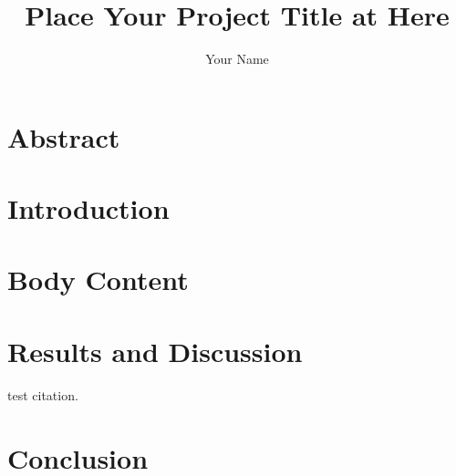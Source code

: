 \documentclass[12pt,a4paper,]{article}
\title{Place Your Project Title at Here}
\author{\textup{Your Name}}
\begin{document}
    
    \tableofcontents
    \newpage

    \section{Abstract}

    \section{Introduction}

    \section{Body Content}

    \section{Results and Discussion}
    \cite{farokhzad2009impact} test citation.
    
    \section{Conclusion}




\end{document}
